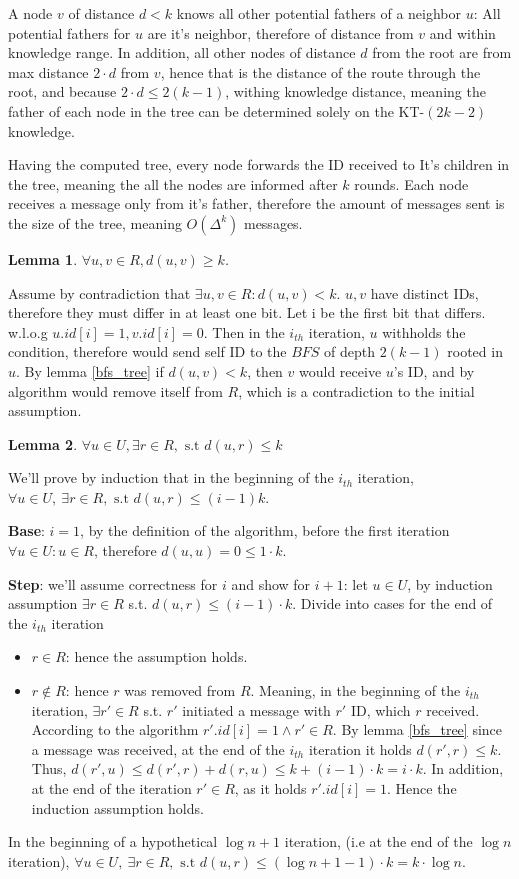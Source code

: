 \documentclass[11pt]{article}
\newtheorem{lemma}{Lemma}
\begin{document}
A node $v$ of distance $d<k$ knows all other potential fathers of a neighbor $u$: 
All potential fathers for $u$ are it's neighbor, therefore of distance from $v$ and within knowledge range. In addition, all other nodes of distance $d$ from the root are from max distance $2\cdot d$ from $v$, hence that is the distance of the route through the root, and because $2\cdot d\le 2(k-1)$, withing knowledge distance, meaning the father of each node in the tree can be determined solely on the KT-$(2k-2)$ knowledge.


Having the computed tree, every node forwards the ID received to It's children in the tree, meaning the all the nodes are informed after $k$ rounds. Each node receives a message only from it's father, therefore the amount of messages sent is the size of the tree, meaning $O(\Delta^k)$ messages.

\begin{lemma}
\label{alpha_rule}
$\forall u,v \in R, d(u,v) \ge k$.
\end{lemma}
Assume by contradiction that $\exists u,v\in R: d(u,v)<k$.
$u,v$ have distinct IDs, therefore they must differ in at least one bit. Let i be the first bit that differs. w.l.o.g $u.id[i]=1, v.id[i]=0$. Then in the $i_{th}$ iteration, $u$ withholds the condition, therefore would send self ID to the $BFS$ of depth $2(k-1)$ rooted in $u$. By lemma \ref{bfs_tree} if $d(u,v)<k$, then $v$ would receive $u$'s ID, and by algorithm would remove itself from $R$, which is a contradiction to the initial assumption.

\begin{lemma}
\label{beta_rule}
$\forall u\in U,\exists r\in R, \text{ s.t } d(u,r) \le k$
\end{lemma}
We'll prove by induction that in the beginning of the $i_{th}$ iteration, $\forall u \in U,\: \exists r\in R, \text{ s.t } d(u,r) \le (i-1)k$.

\textbf{Base}: $i=1$, by the definition of the algorithm, before the first iteration $\forall u\in U: u\in R$, therefore $d(u,u)=0\le 1 \cdot k$.


\textbf{Step}: we’ll assume correctness for $i$ and show for $i+1$:
let $u\in U$, by induction assumption $\exists r\in R$ s.t. $d(u,r)\le (i-1)\cdot k$. Divide into cases for the end of the $i_{th}$ iteration
\begin{itemize}
    \item $r\in R$: hence the assumption holds.
    \item $r \notin R$: hence $r$ was removed from $R$. Meaning, in the beginning of the $i_{th}$ iteration, $\exists r'\in R$ s.t. $r'$ initiated a message with $r'$ ID, which $r$ received. According to the algorithm $r'.id[i]=1 \land r'\in R$. By lemma \ref{bfs_tree} since a message was received, at the end of the $i_{th}$ iteration it holds $d(r',r)\le k$. Thus, $d(r',u)\le d(r',r)+d(r,u)\le k+(i-1)\cdot k=i\cdot k$. In addition, at the end of the iteration $r' \in R$, as it holds $r'.id[i]=1$. Hence the induction assumption holds.
\end{itemize}
In the beginning of a hypothetical $\log{n}+1$ iteration, (i.e at the end of the $\log{n}$ iteration), $\forall u\in U, \: \exists r\in R, \text{ s.t } d(u,r) \le (\log{n}+1-1)\cdot k = k\cdot\log{n}$.
\end{document}
